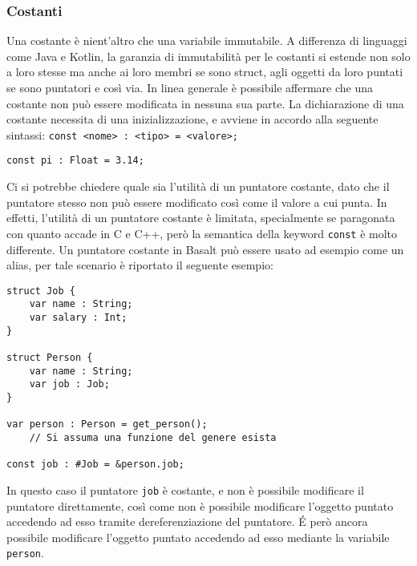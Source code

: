 \subsubsection{Costanti}
Una costante è nient'altro che una variabile immutabile. A differenza di linguaggi come Java e Kotlin, la garanzia di immutabilità per le costanti
si estende non solo a loro stesse ma anche ai loro membri se sono struct, agli oggetti da loro puntati se sono puntatori e così via. In linea generale
è possibile affermare che una costante non può essere modificata in nessuna sua parte. La dichiarazione di una costante necessita di una inizializzazione, 
e avviene in accordo alla seguente sintassi: \texttt{const <nome> : <tipo> = <valore>;}

\vspace{0.5cm}
\begin{lstlisting}[frame=single]
const pi : Float = 3.14;
\end{lstlisting}
\vspace{0.5cm}

Ci si potrebbe chiedere quale sia l'utilità di un puntatore costante, dato che il puntatore stesso non può essere modificato così come il valore a cui punta.
In effetti, l'utilità di un puntatore costante è limitata, specialmente se paragonata con quanto accade in C e C++, però la semantica della keyword \texttt{const}
è molto differente. Un puntatore costante in Basalt può essere usato ad esempio come un alias, per tale scenario è riportato il seguente esempio:

\vspace{0.5cm}
\begin{lstlisting}[frame=single]
struct Job {
    var name : String;
    var salary : Int;
}

struct Person {
    var name : String;
    var job : Job;
}

var person : Person = get_person(); 
    // Si assuma una funzione del genere esista

const job : #Job = &person.job;
\end{lstlisting}
\vspace{0.5cm}

In questo caso il puntatore \texttt{job} è costante, e non è possibile modificare il puntatore direttamente, così come non è possibile modificare l'oggetto puntato 
accedendo ad esso tramite dereferenziazione del puntatore. É però ancora possibile modificare l'oggetto puntato accedendo ad esso mediante la variabile \texttt{person}. \\

